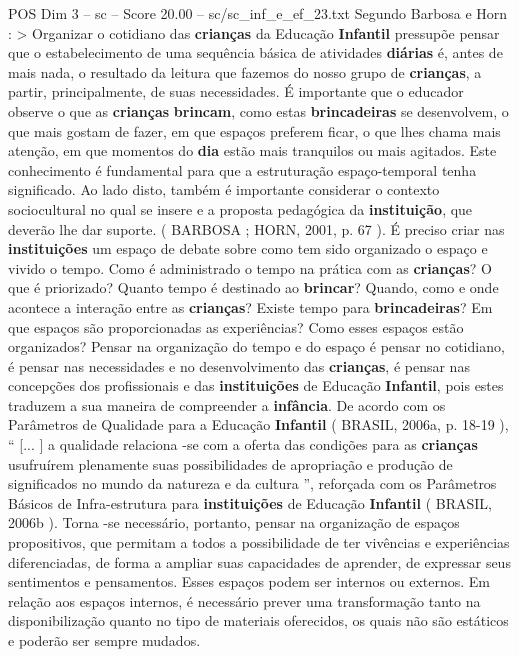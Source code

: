 \begin{textsample}{POS Dim 3 – sc – Score 20.00 – sc/sc\_inf\_e\_ef\_23.txt}
Segundo Barbosa e Horn : > Organizar o cotidiano das \textbf{crianças} da Educação \textbf{Infantil} pressupõe pensar que o estabelecimento de uma sequência básica de atividades \textbf{diárias} é, antes de mais nada, o resultado da leitura que fazemos do nosso grupo de \textbf{crianças}, a partir, principalmente, de suas necessidades.
É importante que o educador observe o que as \textbf{crianças} \textbf{brincam}, como estas \textbf{brincadeiras} se desenvolvem, o que mais gostam de fazer, em que espaços preferem ficar, o que lhes chama mais atenção, em que momentos do \textbf{dia} estão mais tranquilos ou mais agitados.
Este conhecimento é fundamental para que a estruturação espaço-temporal tenha significado.
Ao lado disto, também é importante considerar o contexto sociocultural no qual se insere e a proposta pedagógica da \textbf{instituição}, que deverão lhe dar suporte. ( BARBOSA ; HORN, 2001, p. 67 ).
É preciso criar nas \textbf{instituições} um espaço de debate sobre como tem sido organizado o espaço e vivido o tempo.
Como é administrado o tempo na prática com as \textbf{crianças}?
O que é priorizado?
Quanto tempo é destinado ao \textbf{brincar}?
Quando, como e onde acontece a interação entre as \textbf{crianças}?
Existe tempo para \textbf{brincadeiras}?
Em que espaços são proporcionadas as experiências?
Como esses espaços estão organizados?
Pensar na organização do tempo e do espaço é pensar no cotidiano, é pensar nas necessidades e no desenvolvimento das \textbf{crianças}, é pensar nas concepções dos profissionais e das \textbf{instituições} de Educação \textbf{Infantil}, pois estes traduzem a sua maneira de compreender a \textbf{infância}.
De acordo com os Parâmetros de Qualidade para a Educação \textbf{Infantil} ( BRASIL, 2006a, p. 18-19 ), “ [... ] a qualidade relaciona -se com a oferta das condições para as \textbf{crianças} usufruírem plenamente suas possibilidades de apropriação e produção de significados no mundo da natureza e da cultura ”, reforçada com os Parâmetros Básicos de Infra-estrutura para \textbf{instituições} de Educação \textbf{Infantil} ( BRASIL, 2006b ).
Torna -se necessário, portanto, pensar na organização de espaços propositivos, que permitam a todos a possibilidade de ter vivências e experiências diferenciadas, de forma a ampliar suas capacidades de aprender, de expressar seus sentimentos e pensamentos.
Esses espaços podem ser internos ou externos.
Em relação aos espaços internos, é necessário prever uma transformação tanto na disponibilização quanto no tipo de materiais oferecidos, os quais não são estáticos e poderão ser sempre mudados.

\end{textsample}
